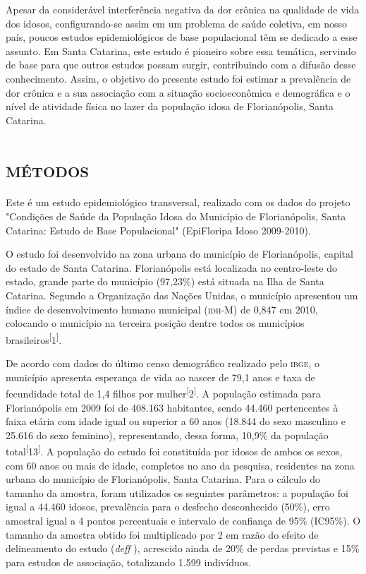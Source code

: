 \documentclass{article}
\begin{document}
Apesar da considerável interferência negativa da dor crônica na qualidade de
vida dos idosos, configurando-se assim em um problema de saúde coletiva, em
nosso país, poucos estudos epidemiológicos de base populacional têm se dedicado
a esse assunto. Em Santa Catarina, este estudo é pioneiro sobre essa temática,
servindo de base para que outros estudos possam surgir, contribuindo com a
difusão desse conhecimento. Assim, o objetivo do presente estudo foi estimar a
prevalência de dor crônica e a sua associação com a situação socioeconômica e
demográfica e o nível de atividade física no lazer da população idosa de
Florianópolis, Santa Catarina.

\section{\textsc{métodos}}

Este é um estudo epidemiológico transversal, realizado com os dados do projeto
"Condições de Saúde da População Idosa do Município de Florianópolis, Santa
Catarina: Estudo de Base Populacional" (EpiFloripa Idoso 2009-2010).

O estudo foi desenvolvido na zona urbana do município de Florianópolis, capital
do estado de Santa Catarina. Florianópolis está localizada no centro-leste do
estado, grande parte do município (97,23\%) está situada na Ilha de Santa
Catarina. Segundo a Organização das Nações Unidas, o município apresentou um
índice de desenvolvimento humano municipal (\textsc{idh}-M) de 0,847 em 2010, colocando o
município na terceira posição dentre todos os municípios
brasileiros\textsuperscript{[}1\textsuperscript{]}.

De acordo com dados do último censo demográfico realizado pelo \textsc{ibge}, o município
apresenta esperança de vida ao nascer de 79,1 anos e taxa de fecundidade total
de 1,4 filhos por mulher\textsuperscript{[}2\textsuperscript{]}. A população estimada para Florianópolis em 2009 foi de 408.163 habitantes,
sendo 44.460 pertencentes à faixa etária com idade igual ou superior a 60 anos
(18.844 do sexo masculino e 25.616 do sexo feminino), representando, dessa
forma, 10,9\% da população total\textsuperscript{[}13\textsuperscript{]}. A população do estudo foi constituída por idosos de ambos os sexos, com 60
anos ou mais de idade, completos no ano da pesquisa, residentes na zona urbana
do município de Florianópolis, Santa Catarina. Para o cálculo do tamanho da
amostra, foram utilizados os seguintes parâmetros: a população foi igual a
44.460 idosos, prevalência para o desfecho desconhecido (50\%), erro amostral
igual a 4 pontos percentuais e intervalo de confiança de 95\% (IC95\%). O
tamanho da amostra obtido foi multiplicado por 2 em razão do efeito de
delineamento do estudo (\textit{deff}
), acrescido ainda de 20\% de perdas previstas e 15\% para estudos de
associação, totalizando 1.599 indivíduos.
\end{document}
